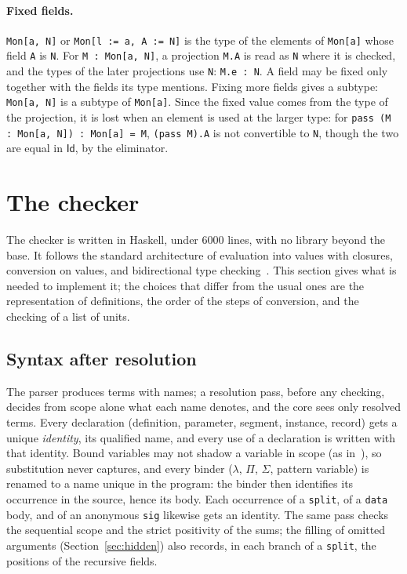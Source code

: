 \documentclass[11pt]{article}
\newcommand{\kw}[1]{\texttt{#1}}
\newcommand{\Id}{\mathsf{Id}}
\theoremstyle{remark}
\begin{document}
\paragraph{Fixed fields.} \kw{Mon[a, N]} or \kw{Mon[l := a, A := N]} is
the type of the elements of \kw{Mon[a]} whose field \kw{A} is \kw{N}. For
\kw{M : Mon[a, N]}, a projection \kw{M.A} is read as \kw{N} where it is
checked, and the types of the later projections use \kw{N}: \kw{M.e : N}.
A field may be fixed only together with the fields its type mentions.
Fixing more fields gives a subtype: \kw{Mon[a, N]} is a subtype of
\kw{Mon[a]}. Since the fixed value comes from the type of the projection,
it is lost when an element is used at the larger type: for
\kw{pass (M : Mon[a, N]) : Mon[a] = M}, \kw{(pass M).A} is not
convertible to \kw{N}, though the two are equal in $\Id$, by the
eliminator.

\section{The checker}\label{sec:checker}

The checker is written in Haskell, under 6000 lines, with no library
beyond the base. It follows the standard architecture of evaluation into
values with closures, conversion on values, and bidirectional type
checking~\cite{C96,Wang}. This section gives what is needed to implement it;
the choices that differ from the usual ones are the representation of
definitions, the order of the steps of conversion, and the checking of
a list of units.

\subsection{Syntax after resolution}

The parser produces terms with names; a resolution pass, before any
checking, decides from scope alone what each name denotes, and the core
sees only resolved terms. Every declaration (definition, parameter,
segment, instance, record) gets a unique \emph{identity}, its qualified
name, and every use of a declaration is written with that identity.
Bound variables may not shadow a variable in scope (as in~\cite{Wang}),
so substitution never captures, and every binder ($\lambda$, $\Pi$,
$\Sigma$, pattern variable) is renamed to a name unique in the program:
the binder then identifies its occurrence in the source, hence its
body. Each occurrence of a \kw{split}, of a \kw{data} body, and of an
anonymous \kw{sig} likewise gets an identity. The same pass checks the
sequential scope and the strict positivity of the sums; the filling of
omitted arguments (Section~\ref{sec:hidden}) also records, in each
branch of a \kw{split}, the positions of the recursive fields.
\end{document}
